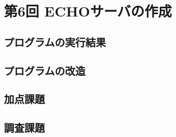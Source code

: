 \documentclass[a4j]{celb-report}
\begin{document}
\newpage
\section{第6回 ECHOサーバの作成}
\subsection{プログラムの実行結果}
\subsection{プログラムの改造}
\subsection{加点課題}
\subsection{調査課題}
\newpage
\begin{thebibliography}{9}

\end{thebibliography}
%
\end{document}
